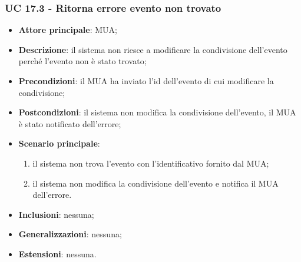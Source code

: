 \subsubsection{UC 17.3 - Ritorna errore evento non trovato} \label{sec:UC17.3}
    \begin{itemize}
        \item \textbf{Attore principale}: MUA;
        \item \textbf{Descrizione}: il sistema non riesce a modificare la condivisione dell'evento perché l'evento non è stato trovato;
        \item \textbf{Precondizioni}: il MUA ha inviato l'id dell'evento di cui modificare la condivisione;
        \item \textbf{Postcondizioni}: il sistema non modifica la condivisione dell'evento, il MUA è stato notificato dell'errore;
        \item \textbf{Scenario principale}:
            \begin{enumerate}
                \item il sistema non trova l'evento con l'identificativo fornito dal MUA;
                \item il sistema non modifica la condivisione dell'evento e notifica il MUA dell'errore.
            \end{enumerate}
        \item \textbf{Inclusioni}: nessuna;
        \item \textbf{Generalizzazioni}: nessuna;
        \item \textbf{Estensioni}: nessuna.
    \end{itemize}

